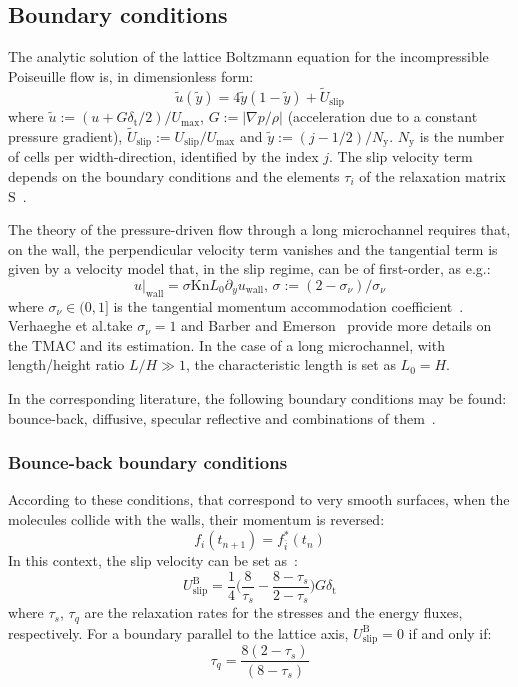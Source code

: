 \subsection{Boundary conditions}
The analytic solution of the lattice Boltzmann equation for the incompressible Poiseuille flow
is, in dimensionless form:
\begin{equation}
 \tilde{u}(\tilde{y}) = 4\tilde{y}(1-\tilde{y}) + \tilde{U}_\mathrm{slip}
\end{equation}
where $\tilde{u} := (u + G\delta_\mathrm{t} / 2) / U_\mathrm{max}$,
$G := |\nabla p / \rho|$ (acceleration due to a constant pressure gradient),
$\tilde{U}_\mathrm{slip} := U_\mathrm{slip} / U_\mathrm{max}$
and $\tilde{y} := (j-1/2)/N_\mathrm{y}$. $N_\mathrm{y}$ is the number of cells per width-direction,
identified by the index $j$. The slip velocity term depends on the boundary
conditions and the elements $\tau_i$ of the relaxation matrix $\mathrm{S}$~\cite{Verhaeghe2009}.

The theory of the pressure-driven flow through a long microchannel requires that, on the wall,
the perpendicular velocity term vanishes and the tangential term is given by a velocity model
that, in the slip regime, can be of first-order, as e.g.:
\begin{equation}
 u|_\mathrm{wall} = \sigma \mathrm{Kn} L_0 \partial_y u_\mathrm{wall} \textrm{, \ } \sigma := (2 - \sigma_\nu)/\sigma_\nu 
 \label{eq:slip_1order}
\end{equation}
where $\sigma_\nu \in (0,1]$ is the tangential momentum accommodation coefficient~\cite{Verhaeghe2009}. 
Verhaeghe et al.\@ take $\sigma_\nu = 1$ and Barber and Emerson~\cite{Barber2006} provide more details on the TMAC and its estimation. 
In the case of a long microchannel, with length/height ratio $L/H \gg 1$, the characteristic length is set as $L_0 = H$.

In the corresponding literature, the following boundary conditions may be found:
bounce-back, diffusive, specular reflective and combinations of them~\cite{Verhaeghe2009}.

\subsubsection{Bounce-back boundary conditions}
According to these conditions, that correspond to very smooth surfaces, when the molecules collide with the walls, their
momentum is reversed:
\begin{equation}
 f_i(t_{n+1}) = f_{\bar{i}}^*(t_n)
\end{equation}
In this context, the slip velocity can be set as~\cite{Verhaeghe2009}:
\begin{equation}
 U_\mathrm{slip}^\mathrm{B} = \frac{1}{4} \Big(\frac{8}{\tau_s} - \frac{8-\tau_s}{2-\tau_s} \Big) G \delta_\mathrm{t}
\end{equation}
where $\tau_s$, $\tau_q$ are the relaxation rates for the stresses and the energy fluxes, respectively.
For a boundary parallel to the lattice axis, $U_\mathrm{slip}^\mathrm{B} = 0$ if
and only if:
\begin{equation}
 \tau_q = \frac{8(2-\tau_s)}{(8-\tau_s)}
\end{equation}

